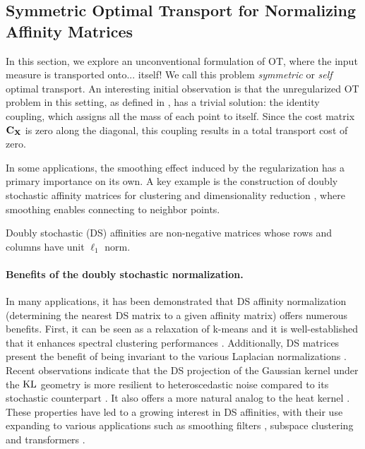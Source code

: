\subsection{Symmetric Optimal Transport for Normalizing Affinity Matrices}\label{sec:doubly_sto}

In this section, we explore an unconventional formulation of OT, where the input measure is transported onto... itself! We call this problem \emph{symmetric} or \emph{self} optimal transport. An interesting initial observation is that the unregularized OT problem in this setting, as defined in , has a trivial solution: the identity coupling, which assigns all the mass of each point to itself. Since the cost matrix $\mathbf{C}_{\mathbf{X}}$ is zero along the diagonal, this coupling results in a total transport cost of zero.

In some applications, the smoothing effect induced by the regularization has a primary importance on its own. A key example is the construction of doubly stochastic affinity matrices for clustering and dimensionality reduction \citep{landa2021doubly,Zass}, where smoothing enables connecting to neighbor points.

Doubly stochastic (DS) affinities are non-negative matrices whose rows and columns have unit $\ell_1$ norm. 

\paragraph{Benefits of the doubly stochastic normalization.}
In many applications, it has been demonstrated that DS affinity normalization (\ie determining the nearest DS matrix to a given affinity matrix) offers numerous benefits. First, it can be seen as a relaxation of k-means \citep{zass2005unifying} and it is well-established that it enhances spectral clustering performances \citep{Ding_understand,Zass,beauchemin2015affinity}. Additionally, DS matrices present the benefit of being invariant to the various Laplacian normalizations \citep{von2007tutorial}. Recent observations indicate that the DS projection of the Gaussian kernel under the $\operatorname{KL}$ geometry is more resilient to heteroscedastic noise compared to its stochastic counterpart \citep{landa2021doubly}. It also offers a more natural analog to the heat kernel \citep{marshall2019manifold}.
These properties have led to a growing interest in DS affinities, with their use expanding to various applications such as smoothing filters \citep{Milanfar}, subspace clustering \citep{lim2020doubly} and transformers \citep{sander2022sinkformers}.






